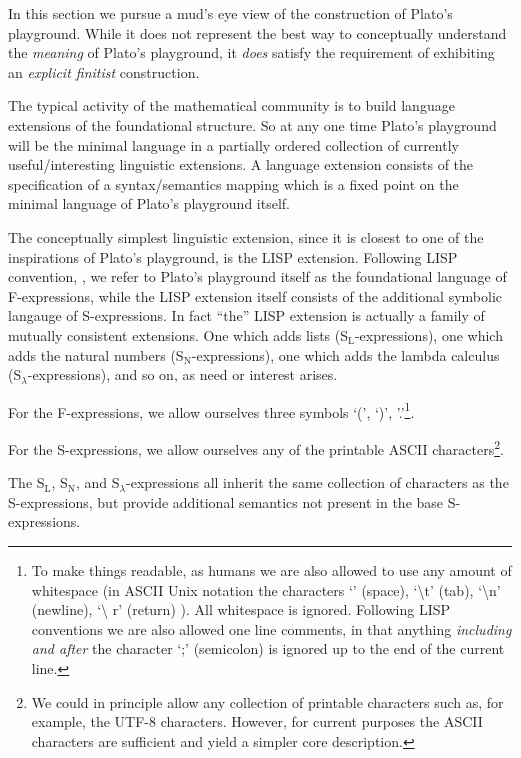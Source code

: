 In this section we pursue a mud's eye view of the construction of Plato's
playground. While it does not represent the best way to conceptually understand
the \emph{meaning} of Plato's playground, it \emph{does} satisfy the requirement
of exhibiting an \emph{explicit finitist} construction.

The typical activity of the mathematical community is to build language
extensions of the foundational structure. So at any one time Plato's playground
will be the minimal language in a partially ordered collection of currently
useful/interesting linguistic extensions. A language extension consists of the
specification of a syntax/semantics mapping which is a fixed point on the
minimal language of Plato's playground itself.

The conceptually simplest linguistic extension, since it is closest to one of
the inspirations of Plato's playground, is the LISP extension. Following LISP
convention, \cite{mcCarthy1960lisp}, we refer to Plato's playground itself as
the foundational language of F-expressions, while the LISP extension itself
consists of the additional symbolic langauge of S-expressions. In fact ``the''
LISP extension is actually a family of mutually consistent extensions. One which
adds lists (S$_{\text{L}}$-expressions), one which adds the natural numbers
(S$_{\text{N}}$-expressions), one which adds the lambda calculus
(S$_{\lambda}$-expressions), and so on, as need or interest arises.

For the F-expressions, we allow ourselves three symbols `(', `)',
'.'\footnote{To make things readable, as humans we are also allowed to use any
amount of whitespace (in ASCII Unix notation the characters `\textvisiblespace'
(space), `\textbackslash t' (tab), `\textbackslash n' (newline), `\textbackslash
r' (return) ). All whitespace is ignored. Following LISP conventions we are also
allowed one line comments, in that anything \emph{including and after} the
character `;' (semicolon) is ignored up to the end of the current line.}.

For the S-expressions, we allow ourselves any of the printable ASCII
characters\footnote{We could in principle allow any collection of printable
characters such as, for example, the UTF-8 characters. However, for current
purposes the ASCII characters are sufficient and yield a simpler core
description.}.

The S$_{\text{L}}$, S$_{\text{N}}$, and S$_{\lambda}$-expressions all inherit
the same collection of characters as the S-expressions, but provide additional
semantics not present in the base S-expressions.


